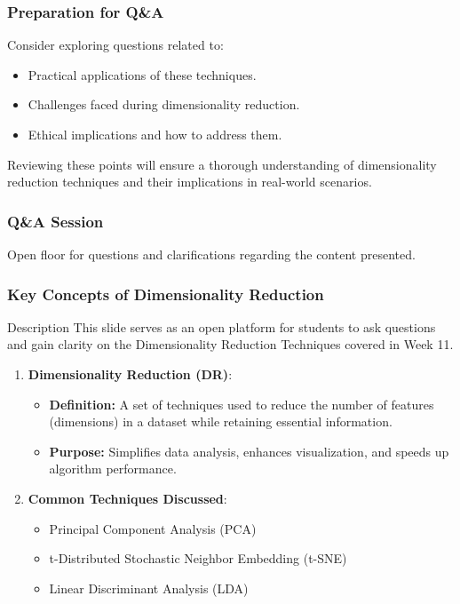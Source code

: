 \documentclass[aspectratio=169]{beamer}
\begin{document}
\begin{frame}[fragile]
    \frametitle{Preparation for Q\&A}
    Consider exploring questions related to:
    \begin{itemize}
        \item Practical applications of these techniques.
        \item Challenges faced during dimensionality reduction.
        \item Ethical implications and how to address them.
    \end{itemize}
    
    Reviewing these points will ensure a thorough understanding of dimensionality reduction techniques and their implications in real-world scenarios.
\end{frame}

\begin{frame}[fragile]
    \frametitle{Q\&A Session}
    Open floor for questions and clarifications regarding the content presented.
\end{frame}

\begin{frame}[fragile]
    \frametitle{Key Concepts of Dimensionality Reduction}
    \begin{block}{Description}
        This slide serves as an open platform for students to ask questions and gain clarity on the Dimensionality Reduction Techniques covered in Week 11.
    \end{block}
    
    \begin{enumerate}
        \item \textbf{Dimensionality Reduction (DR)}:
        \begin{itemize}
            \item \textbf{Definition:} A set of techniques used to reduce the number of features (dimensions) in a dataset while retaining essential information.
            \item \textbf{Purpose:} Simplifies data analysis, enhances visualization, and speeds up algorithm performance.
        \end{itemize}
        
        \item \textbf{Common Techniques Discussed}:
        \begin{itemize}
            \item Principal Component Analysis (PCA)
            \item t-Distributed Stochastic Neighbor Embedding (t-SNE)
            \item Linear Discriminant Analysis (LDA)
        \end{itemize}
    \end{enumerate}
\end{frame}
\end{document}
